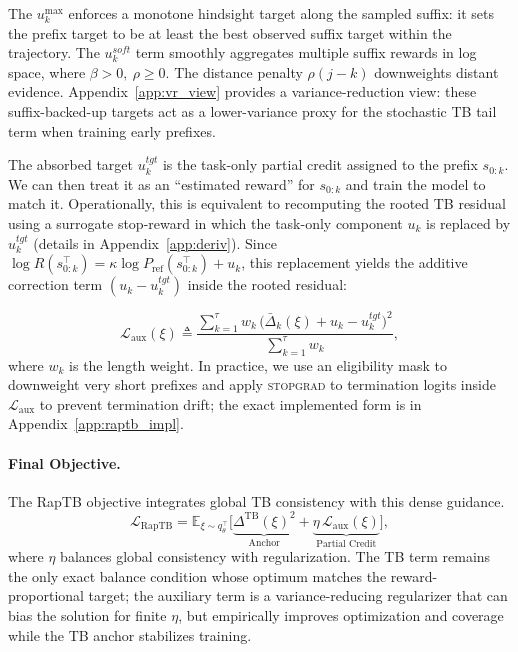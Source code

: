 \documentclass{article}
\theoremstyle{plain}
\theoremstyle{definition}
\theoremstyle{remark}
\begin{document}
The $u_k^{\max}$ enforces a monotone hindsight target along the sampled suffix: it sets the prefix target to be at least the best observed suffix target within the trajectory.
The $u_k^{soft}$ term smoothly aggregates multiple suffix rewards in log space, where $\beta>0,\ \rho\ge 0$.
The distance penalty $\rho(j-k)$ downweights distant evidence.
Appendix~\ref{app:vr_view} provides a variance-reduction view: these suffix-backed-up targets act as a lower-variance proxy for the stochastic TB tail term when training early prefixes.

The absorbed target $u_k^{tgt}$ is the task-only partial credit assigned to the prefix $s_{0:k}$. We can then treat it as an ``estimated reward'' for $s_{0:k}$ and train the model to match it. 
Operationally, this is equivalent to recomputing the rooted TB residual using a surrogate stop-reward in which the task-only component $u_k$ is replaced by $u_k^{tgt}$ (details in Appendix~\ref{app:deriv}). Since $\log R(s_{0:k}^{\top})=\kappa\log P_{\mathrm{ref}}(s_{0:k}^{\top})+u_k$, this replacement yields the additive correction term $(u_k-u_k^{tgt})$ inside the rooted residual:

\begin{equation}
\label{eq:aux}
\mathcal{L}_{\mathrm{aux}}(\xi)
\triangleq
\frac{\sum_{k=1}^{\tau} w_k\,\big(\bar\Delta_k(\xi) + u_k-u_k^{tgt})^2}
{\sum_{k=1}^{\tau} w_k},
\end{equation}
where $w_k$ is the length weight. In practice, we use an eligibility mask to downweight very short prefixes and apply \textsc{stopgrad} to termination logits inside $\mathcal{L}_{\mathrm{aux}}$ to prevent termination drift; the exact implemented form is in Appendix~\ref{app:raptb_impl}.

\paragraph{Final Objective.}
The RapTB objective integrates global TB consistency with this dense guidance.
\begin{equation}
\label{eq:raptb_final}
\mathcal{L}_{\mathrm{RapTB}}
=
\mathbb{E}_{\xi\sim q_\theta^{\top}}
\Big[
\underbrace{\Delta^{\mathrm{TB}}(\xi)^2}_{\text{Anchor}}
+
\underbrace{\eta\,\mathcal{L}_{\mathrm{aux}}(\xi)}_{\text{Partial Credit}}
\Big],
\end{equation}
where $\eta$ balances global consistency with regularization. The TB term remains the only exact balance condition whose optimum matches the reward-proportional target; the auxiliary term is a variance-reducing regularizer that can bias the solution for finite $\eta$, but empirically improves optimization and coverage while the TB anchor stabilizes training.
\end{document}
